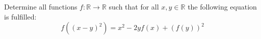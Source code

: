 Determine all functions $f\colon \mathbb{R} \rightarrow \mathbb{R}$ such that
for all $x,y \in \mathbb{R}$ the following equation is fulfilled:
$$f((x-y)^2)=x^2-2yf(x)+(f(y))^2$$